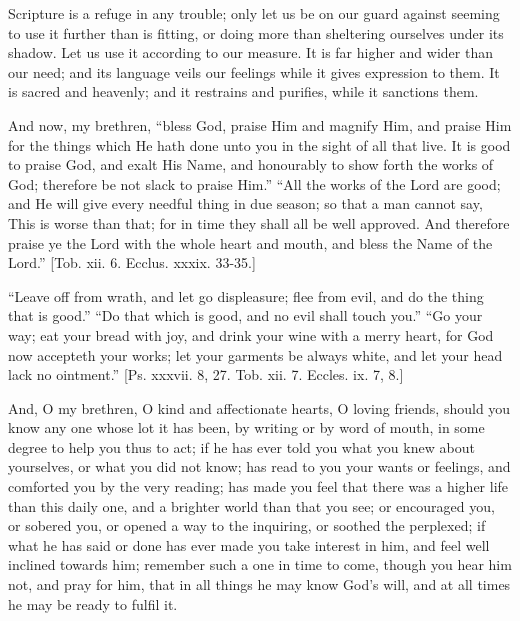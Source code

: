 Scripture is a refuge in any trouble; only let us be on our guard
against seeming to use it further than is fitting, or doing more than
sheltering ourselves under its shadow. Let us use it according to our
measure. It is far higher and wider than our need; and its language
veils our feelings while it gives expression to them. It is sacred and
heavenly; and it restrains and purifies, while it sanctions them.

And now, my brethren, ``bless God, praise Him and magnify Him,
and praise Him for the things which He hath done unto you in the sight
of all that live. It is good to praise God, and exalt His Name, and
honourably to show forth the works of God; therefore be not slack to
praise Him.'' ``All the works of the Lord are good; and He
will give every needful thing in due season; so that a man cannot say,
This is worse than that; for in time they shall all be well approved.
And therefore praise ye the Lord with the whole heart and mouth, and
bless the Name of the Lord.'' [Tob. xii. 6. Ecclus. xxxix. 33-35.]

``Leave off from wrath, and let go displeasure; flee from evil,
and do the thing that is good.'' ``Do that which is good, and
no evil shall touch you.'' ``Go your way; eat your bread with
joy, and drink your wine with a merry heart, for God now accepteth
your works; let your garments be always white, and let your head lack
no ointment.'' [Ps. xxxvii. 8, 27. Tob. xii. 7. Eccles. ix. 7, 8.]

And, O my brethren, O kind and affectionate hearts, O loving
friends, should you know any one whose lot it has been, by writing or
by word of mouth, in some degree to help you thus to act; if he has
ever told you what you knew about yourselves, or what you did not
know; has read to you your wants or feelings, and comforted you by the
very reading; has made you feel that there was a higher life than this
daily one, and a brighter world than that you see; or encouraged you,
or sobered you, or opened a way to the inquiring, or soothed the
perplexed; if what he has said or done has ever made you take interest
in him, and feel well inclined towards him; remember such a one in
time to come, though you hear him not, and pray for him, that in all
things he may know God's will, and at all times he may be ready to
fulfil it.
